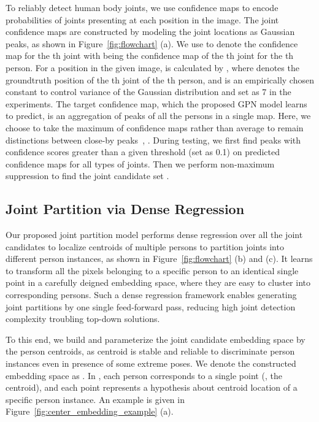 \documentclass[10pt,twocolumn,letterpaper]{article}
\begin{document}
To reliably detect human body joints, we use  confidence maps to encode probabilities  of joints presenting at each position in the image. The joint confidence maps  are constructed by modeling
the joint locations as Gaussian peaks, as shown in Figure~\ref{fig:flowchart} (a). We use  to denote the confidence map for the th joint with   being the
confidence map of the th joint for the th person. For a position  in the given image,  is calculated by
,
where  denotes the groundtruth position of the th joint of the th person, and  is an empirically chosen constant to control  variance of the Gaussian distribution and set as 7 in the experiments.
The target confidence map, which the proposed GPN model learns to predict, is an aggregation of peaks of all the persons in a single map. Here, we choose to take the maximum of confidence maps
rather than average to remain distinctions between close-by peaks~\cite{cao2017realtime}, \ie .
During testing, we first find peaks with confidence scores greater than a given threshold  (set as 0.1) on predicted confidence maps  for all types of joints.
Then we perform non-maximum suppression to find the joint candidate set .



\subsection{Joint Partition via Dense Regression}
\label{subsec:partition}

Our proposed joint partition model performs dense regression over all the joint candidates to localize centroids of multiple persons to partition joints into different person instances,
as shown in Figure~\ref{fig:flowchart} (b) and (c). It learns to transform all the pixels belonging to a specific person to an identical single point in a carefully deigned embedding space, where they are easy to cluster into corresponding persons. Such a dense regression framework enables generating joint partitions by one single feed-forward pass, reducing high joint detection complexity troubling top-down solutions.

To this end, we build and parameterize the joint candidate embedding space  by the person centroids, as centroid is  stable and reliable to discriminate  person instances even in presence of some extreme poses. We denote the constructed  embedding space as . In  , each person corresponds to a single point (\ie, the centroid), and  each point  represents a hypothesis about  centroid location of a specific person instance. An example is given in Figure~\ref{fig:center_embedding_example} (a).
\end{document}
